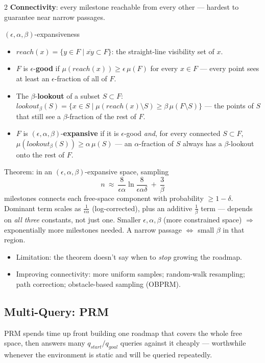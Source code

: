 \documentclass[10pt,a4paper]{article}
\newcommand{\keyterm}[1]{\textbf{#1}}
\begin{document}
\begin{multicols}{2}
\keyterm{Connectivity}: every milestone reachable from every other — hardest to guarantee near narrow passages.
\begin{defbox}{$(\epsilon,\alpha,\beta)$-expansiveness}
\begin{itemize}
\item $reach(x)=\{y\in F\mid \overline{xy}\subset F\}$: the straight-line visibility set of $x$.
\item $F$ is $\epsilon$-\keyterm{good} if $\mu(reach(x))\ge\epsilon\,\mu(F)$ for every $x\in F$ --- every point sees at least an $\epsilon$-fraction of all of $F$.
\item The $\beta$-\keyterm{lookout} of a subset $S\subset F$: $lookout_\beta(S)=\{x\in S\mid \mu(reach(x)\setminus S)\ge\beta\,\mu(F\setminus S)\}$ --- the points of $S$ that still see a $\beta$-fraction of the rest of $F$.
\item $F$ is $(\epsilon,\alpha,\beta)$-\keyterm{expansive} if it is $\epsilon$-good \emph{and}, for every connected $S\subset F$, $\mu(lookout_\beta(S))\ge\alpha\,\mu(S)$ --- an $\alpha$-fraction of $S$ always has a $\beta$-lookout onto the rest of $F$.
\end{itemize}
\end{defbox}
Theorem: in an $(\epsilon,\alpha,\beta)$-expansive space, sampling
\[
n\ \approx\ \frac{8}{\epsilon\alpha}\ln\frac{8}{\epsilon\alpha\delta}\ +\ \frac3\beta
\]
milestones connects each free-space component with probability $\ge1-\delta$. Dominant term scales as $\tfrac1{\epsilon\alpha}$ (log-corrected), plus an additive $\tfrac1\beta$ term --- depends on \emph{all three} constants, not just one. Smaller $\epsilon,\alpha,\beta$ (more constrained space) $\Rightarrow$ exponentially more milestones needed. A narrow passage $\Leftrightarrow$ small $\beta$ in that region.
\begin{itemize}
\item Limitation: the theorem doesn't say when to \emph{stop} growing the roadmap.
\item Improving connectivity: more uniform samples; random-walk resampling; path correction; obstacle-based sampling (OBPRM).
\end{itemize}

\subsection{Multi-Query: PRM}
PRM spends time up front building one roadmap that covers the whole free space, then answers many $q_{start}/q_{goal}$ queries against it cheaply --- worthwhile whenever the environment is static and will be queried repeatedly.


\end{multicols}
\end{document}

